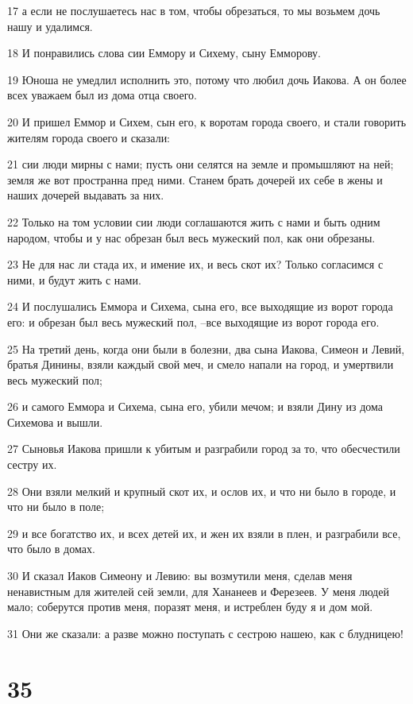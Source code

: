 \par 17 а если не послушаетесь нас в том, чтобы обрезаться, то мы возьмем дочь нашу и удалимся.
\par 18 И понравились слова сии Еммору и Сихему, сыну Емморову.
\par 19 Юноша не умедлил исполнить это, потому что любил дочь Иакова. А он более всех уважаем был из дома отца своего.
\par 20 И пришел Еммор и Сихем, сын его, к воротам города своего, и стали говорить жителям города своего и сказали:
\par 21 сии люди мирны с нами; пусть они селятся на земле и промышляют на ней; земля же вот пространна пред ними. Станем брать дочерей их себе в жены и наших дочерей выдавать за них.
\par 22 Только на том условии сии люди соглашаются жить с нами и быть одним народом, чтобы и у нас обрезан был весь мужеский пол, как они обрезаны.
\par 23 Не для нас ли стада их, и имение их, и весь скот их? Только согласимся с ними, и будут жить с нами.
\par 24 И послушались Еммора и Сихема, сына его, все выходящие из ворот города его: и обрезан был весь мужеский пол, --все выходящие из ворот города его.
\par 25 На третий день, когда они были в болезни, два сына Иакова, Симеон и Левий, братья Динины, взяли каждый свой меч, и смело напали на город, и умертвили весь мужеский пол;
\par 26 и самого Еммора и Сихема, сына его, убили мечом; и взяли Дину из дома Сихемова и вышли.
\par 27 Сыновья Иакова пришли к убитым и разграбили город за то, что обесчестили сестру их.
\par 28 Они взяли мелкий и крупный скот их, и ослов их, и что ни было в городе, и что ни было в поле;
\par 29 и все богатство их, и всех детей их, и жен их взяли в плен, и разграбили все, что было в домах.
\par 30 И сказал Иаков Симеону и Левию: вы возмутили меня, сделав меня ненавистным для жителей сей земли, для Хананеев и Ферезеев. У меня людей мало; соберутся против меня, поразят меня, и истреблен буду я и дом мой.
\par 31 Они же сказали: а разве можно поступать с сестрою нашею, как с блудницею!

\chapter{35}

